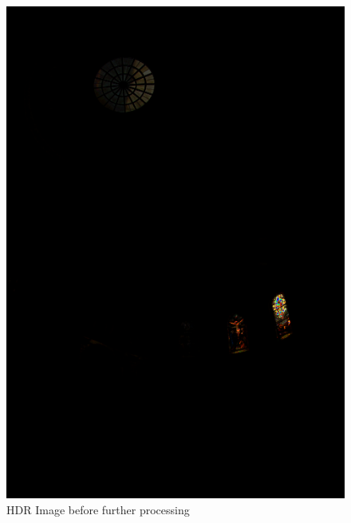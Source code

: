 \documentclass[a4paper,12pt,oneside,final]{report}
\newenvironment{changemargin}[2]{\begin{list}{}{%
\setlength{\topsep}{0pt}%
\setlength{\leftmargin}{0pt}%
\setlength{\rightmargin}{0pt}%
\setlength{\listparindent}{\parindent}%
\setlength{\itemindent}{\parindent}%
\setlength{\parsep}{0pt plus 1pt}%
\addtolength{\leftmargin}{#1}%
\addtolength{\rightmargin}{#2}%
}\item }{\end{list}}
\begin{document}
\begin{figure}[!h]
\begin{changemargin}{-50mm}{-50mm}
\center
\includegraphics[scale=0.3]{memorial_hdr.png}
\caption{HDR Image before further processing}
\end{changemargin}
\end{figure}
\end{document}
